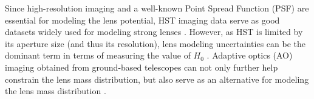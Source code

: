 \documentclass[useAMS,usenatbib]{mnras}
\begin{document}
Since high-resolution imaging and a well-known Point Spread Function (PSF) are essential for modeling the lens potential, HST imaging data serve as good datasets widely used for modeling strong lenses \citep[e.g.,][]{SuyuEtal09,SuyuEtal10,BirrerEtal15,WongEtal17,BirrerEtal16,BirrerEtal18}. However, as HST is limited by its aperture size (and thus its resolution), lens modeling uncertainties can be the dominant term in terms of measuring the value of $H_{0}$ \citep[e.g.,][]{SuyuEtal14}.
Adaptive optics (AO) imaging obtained from ground-based telescopes can not only further help constrain the lens mass distribution, but also serve as an alternative for modeling the lens mass distribution \citep{GChenEtal16}.
\end{document}
